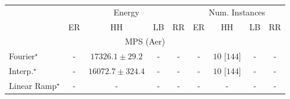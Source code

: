 \begin{tabular}{l|cccc|cccc|}
\toprule
& \multicolumn{4}{c|}{Energy} & \multicolumn{4}{c|}{Num. Instances} \\
            & ER & HH & LB & RR & ER & HH & LB & RR \\
\midrule
\multicolumn{9}{c}{\rule{0pt}{8pt}MPS (Aer)} \\
\midrule
Fourier$^\star$ & {\cellcolor[HTML]{000000}} \color[HTML]{F1F1F1} {\cellcolor{white}} \color{black} - & {\cellcolor[HTML]{4D004B}} \color[HTML]{F1F1F1} $17326.1\pm 29.2$ & {\cellcolor[HTML]{000000}} \color[HTML]{F1F1F1} {\cellcolor{white}} \color{black} - & {\cellcolor[HTML]{000000}} \color[HTML]{F1F1F1} {\cellcolor{white}} \color{black} - & {\cellcolor[HTML]{000000}} \color[HTML]{F1F1F1} {\cellcolor{white}} \color{black} - & {\cellcolor[HTML]{49006A}} \color[HTML]{F1F1F1} $10$ [$144$] & {\cellcolor[HTML]{000000}} \color[HTML]{F1F1F1} {\cellcolor{white}} \color{black} - & {\cellcolor[HTML]{000000}} \color[HTML]{F1F1F1} {\cellcolor{white}} \color{black} - \\
Interp.$^\star$ & {\cellcolor[HTML]{000000}} \color[HTML]{F1F1F1} {\cellcolor{white}} \color{black} - & {\cellcolor[HTML]{F7FCFD}} \color[HTML]{000000} $16072.7\pm 324.4$ & {\cellcolor[HTML]{000000}} \color[HTML]{F1F1F1} {\cellcolor{white}} \color{black} - & {\cellcolor[HTML]{000000}} \color[HTML]{F1F1F1} {\cellcolor{white}} \color{black} - & {\cellcolor[HTML]{000000}} \color[HTML]{F1F1F1} {\cellcolor{white}} \color{black} - & {\cellcolor[HTML]{49006A}} \color[HTML]{F1F1F1} $10$ [$144$] & {\cellcolor[HTML]{000000}} \color[HTML]{F1F1F1} {\cellcolor{white}} \color{black} - & {\cellcolor[HTML]{000000}} \color[HTML]{F1F1F1} {\cellcolor{white}} \color{black} - \\
Linear Ramp$^\star$ & {\cellcolor[HTML]{000000}} \color[HTML]{F1F1F1} {\cellcolor{white}} \color{black} - & {\cellcolor[HTML]{000000}} \color[HTML]{F1F1F1} {\cellcolor{white}} \color{black} - & {\cellcolor[HTML]{000000}} \color[HTML]{F1F1F1} {\cellcolor{white}} \color{black} - & {\cellcolor[HTML]{000000}} \color[HTML]{F1F1F1} {\cellcolor{white}} \color{black} - & {\cellcolor[HTML]{000000}} \color[HTML]{F1F1F1} {\cellcolor{white}} \color{black} - & {\cellcolor[HTML]{000000}} \color[HTML]{F1F1F1} {\cellcolor{white}} \color{black} - & {\cellcolor[HTML]{000000}} \color[HTML]{F1F1F1} {\cellcolor{white}} \color{black} - & {\cellcolor[HTML]{000000}} \color[HTML]{F1F1F1} {\cellcolor{white}} \color{black} - \\

\end{tabular}
